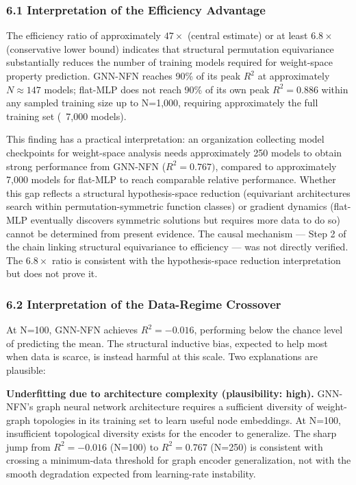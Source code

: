 
\subsubsection{6.1 Interpretation of the Efficiency Advantage}

The efficiency ratio of approximately $47\times$ (central estimate) or at least 6.$8\times$ (conservative lower bound) indicates that structural permutation equivariance substantially reduces the number of training models required for weight-space property prediction. GNN-NFN reaches 90\% of its peak $R^2$ at approximately $N\approx 147$ models; flat-MLP does not reach 90\% of its own peak $R^{2}=0.886$ within any sampled training size up to N=1,000, requiring approximately the full training set (~7,000 models).

This finding has a practical interpretation: an organization collecting model checkpoints for weight-space analysis needs approximately 250 models to obtain strong performance from GNN-NFN ($R^{2}=0.767)$, compared to approximately 7,000 models for flat-MLP to reach comparable relative performance. Whether this gap reflects a structural hypothesis-space reduction (equivariant architectures search within permutation-symmetric function classes) or gradient dynamics (flat-MLP eventually discovers symmetric solutions but requires more data to do so) cannot be determined from present evidence. The causal mechanism --- Step 2 of the chain linking structural equivariance to efficiency --- was not directly verified. The 6.$8\times$ ratio is consistent with the hypothesis-space reduction interpretation but does not prove it.

\subsubsection{6.2 Interpretation of the Data-Regime Crossover}

At N=100, GNN-NFN achieves $R^{2}=-0.016$, performing below the chance level of predicting the mean. The structural inductive bias, expected to help most when data is scarce, is instead harmful at this scale. Two explanations are plausible:

\textbf{Underfitting due to architecture complexity (plausibility: high).} GNN-NFN's graph neural network architecture requires a sufficient diversity of weight-graph topologies in its training set to learn useful node embeddings. At N=100, insufficient topological diversity exists for the encoder to generalize. The sharp jump from $R^{2}=-0.016$ (N=100) to $R^{2}=0.767$ (N=250) is consistent with crossing a minimum-data threshold for graph encoder generalization, not with the smooth degradation expected from learning-rate instability.

